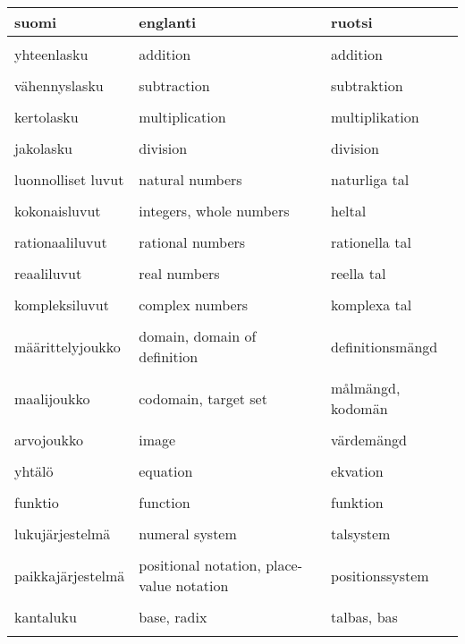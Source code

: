 
\begin{tabular}{| l | l | l}
	\textbf{suomi} & \textbf{englanti} & \textbf{ruotsi} \\ \hline \\
		yhteenlasku & addition & addition\\ \\
		vähennyslasku & subtraction & subtraktion  \\ \\
		kertolasku & multiplication & multiplikation \\ \\		
		jakolasku & division & division  \\ \\
		luonnolliset luvut & natural numbers & naturliga tal  \\ \\
		kokonaisluvut & integers, whole numbers & heltal \\ \\
		rationaaliluvut & rational numbers & rationella tal  \\ \\
		reaaliluvut & real numbers & reella tal  \\ \\
		kompleksiluvut & complex numbers & komplexa tal  \\ \\
		määrittelyjoukko & domain, domain of definition & definitionsmängd  \\ \\
		maalijoukko & codomain, target set & målmängd, kodomän \\ \\
		arvojoukko & image & värdemängd\\ \\
		yhtälö & equation & ekvation \\ \\
		funktio & function & funktion  \\ \\
		lukujärjestelmä & numeral system & talsystem  \\ \\
		paikkajärjestelmä & positional notation, place-value notation & positionssystem  \\ \\
		kantaluku & base, radix & talbas, bas  \\ \\
\end{tabular}
